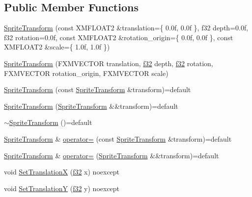 \subsection*{Public Member Functions}
\begin{DoxyCompactItemize}
\item 
\hyperlink{structmage_1_1_sprite_transform_ad7db5e256ed616138a288160f3a9c225}{Sprite\+Transform} (const X\+M\+F\+L\+O\+A\+T2 \&translation=\{ 0.\+0f, 0.\+0f \}, f32 depth=0.\+0f, f32 rotation=0.\+0f, const X\+M\+F\+L\+O\+A\+T2 \&rotation\+\_\+origin=\{ 0.\+0f, 0.\+0f \}, const X\+M\+F\+L\+O\+A\+T2 \&scale=\{ 1.\+0f, 1.\+0f \})
\item 
\hyperlink{structmage_1_1_sprite_transform_a831f274c4f8e93eff4e26f2fc1ed4420}{Sprite\+Transform} (F\+X\+M\+V\+E\+C\+T\+OR translation, \hyperlink{namespacemage_a6a44ad388483959dc4dff9f2aef91431}{f32} depth, \hyperlink{namespacemage_a6a44ad388483959dc4dff9f2aef91431}{f32} rotation, F\+X\+M\+V\+E\+C\+T\+OR rotation\+\_\+origin, F\+X\+M\+V\+E\+C\+T\+OR scale)
\item 
\hyperlink{structmage_1_1_sprite_transform_a0126a3f6c7f486f10ec5d5ffd1180698}{Sprite\+Transform} (const \hyperlink{structmage_1_1_sprite_transform}{Sprite\+Transform} \&transform)=default
\item 
\hyperlink{structmage_1_1_sprite_transform_a53d7da4498f4f9f67be2994eb4593c3a}{Sprite\+Transform} (\hyperlink{structmage_1_1_sprite_transform}{Sprite\+Transform} \&\&transform)=default
\item 
\hyperlink{structmage_1_1_sprite_transform_a14a3614023996cbb071c3de99f9528bc}{$\sim$\+Sprite\+Transform} ()=default
\item 
\hyperlink{structmage_1_1_sprite_transform}{Sprite\+Transform} \& \hyperlink{structmage_1_1_sprite_transform_af0adccff92d48e7b347e66277981ee07}{operator=} (const \hyperlink{structmage_1_1_sprite_transform}{Sprite\+Transform} \&transform)=default
\item 
\hyperlink{structmage_1_1_sprite_transform}{Sprite\+Transform} \& \hyperlink{structmage_1_1_sprite_transform_a9278d3fd0a6d346b188515b67a1adfc2}{operator=} (\hyperlink{structmage_1_1_sprite_transform}{Sprite\+Transform} \&\&transform)=default
\item 
void \hyperlink{structmage_1_1_sprite_transform_ae63e3d97edc37e440042172d0d924bdc}{Set\+TranslationX} (\hyperlink{namespacemage_a6a44ad388483959dc4dff9f2aef91431}{f32} x) noexcept
\item 
void \hyperlink{structmage_1_1_sprite_transform_ab9a473790dda739c113478dc417e5d9a}{Set\+TranslationY} (\hyperlink{namespacemage_a6a44ad388483959dc4dff9f2aef91431}{f32} y) noexcept

\end{DoxyCompactItemize}
